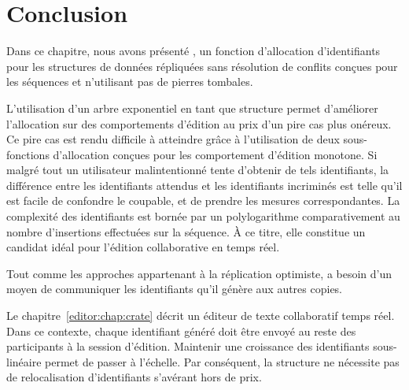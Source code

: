 
\section{Conclusion}
\label{repl:sec:conclusion}

Dans ce chapitre, nous avons présenté \LSEQ, un fonction d'allocation
d'identifiants pour les structures de données répliquées sans résolution de
conflits conçues pour les séquences et n'utilisant pas de pierres tombales.


L'utilisation d'un arbre exponentiel en tant que structure permet d'améliorer
l'allocation sur des comportements d'édition au prix d'un pire cas plus
onéreux. Ce pire cas est rendu difficile à atteindre grâce à l'utilisation de
deux sous-fonctions d'allocation conçues pour les comportement d'édition
monotone. Si malgré tout un utilisateur malintentionné tente d'obtenir de tels
identifiants, la différence entre les identifiants attendus et les identifiants
incriminés est telle qu'il est facile de confondre le coupable, et de prendre
les mesures correspondantes. La complexité des identifiants \LSEQ est bornée par
un polylogarithme comparativement au nombre d'insertions effectuées sur la
séquence. À ce titre, elle constitue un candidat idéal pour l'édition
collaborative en temps réel.

Tout comme les approches appartenant à la réplication optimiste, \LSEQ a besoin
d'un moyen de communiquer les identifiants qu'il génère aux autres copies.


Le chapitre~\ref{editor:chap:crate} décrit un éditeur de texte collaboratif
temps réel. Dans ce contexte, chaque identifiant généré doit être envoyé au
reste des participants à la session d'édition. Maintenir une croissance des
identifiants sous-linéaire permet de passer à l'échelle. Par conséquent, la
structure ne nécessite pas de relocalisation d'identifiants s'avérant hors de
prix.

